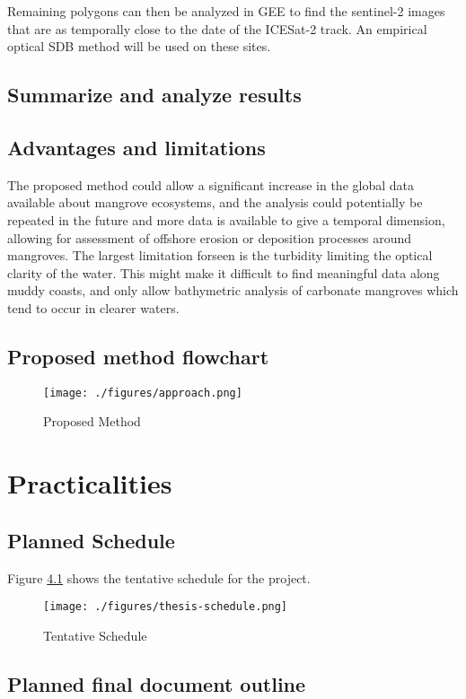 Remaining polygons can then be analyzed in GEE to find the sentinel-2 images that are as temporally close to the date of the ICESat-2 track. An empirical optical SDB method will be used on these sites.

\section{Summarize and analyze results}
\section{Advantages and limitations}
The proposed method could allow a significant increase in the global data available about mangrove ecosystems, and the analysis could potentially be repeated in the future and more data is available to give a temporal dimension, allowing for assessment of offshore erosion or deposition processes around mangroves. The largest limitation forseen is the turbidity limiting the optical clarity of the water. This might make it difficult to find meaningful data along muddy coasts, and only allow bathymetric analysis of carbonate mangroves which tend to occur in clearer waters.

\section{Proposed method flowchart}
\begin{figure}
      \centering
      \texttt{[image: ./figures/approach.png]}
      \caption{Proposed Method}
      \label{method-flowchart}
\end{figure}

\chapter{Practicalities}

\section{Planned Schedule}

Figure \ref{project-schedule} shows the tentative schedule for the project.
\begin{landscape}

      \begin{figure}
            \centering
            \texttt{[image: ./figures/thesis-schedule.png]}
            \caption{Tentative Schedule}
            \label{project-schedule}
      \end{figure}

\end{landscape}
\section{Planned final document outline}

